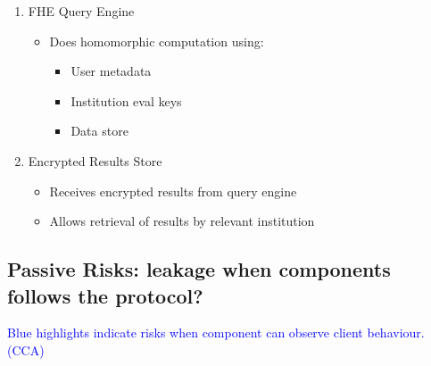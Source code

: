 \begin{enumerate}
\begin{itemize}
          \end{itemize}
    \item FHE Query Engine
          \begin{itemize}
              \item Does homomorphic computation using:
                    \begin{itemize}
                        \item User metadata
                        \item Institution eval keys
                        \item Data store
                    \end{itemize}
          \end{itemize}
    \item Encrypted Results Store
          \begin{itemize}
              \item Receives encrypted results from query engine
              \item Allows retrieval of results by relevant institution
          \end{itemize}
\end{enumerate}

\subsection{Passive Risks: leakage when components follows the protocol?}

\textcolor{blue}{Blue highlights indicate risks when component can observe client behaviour. (CCA)}

